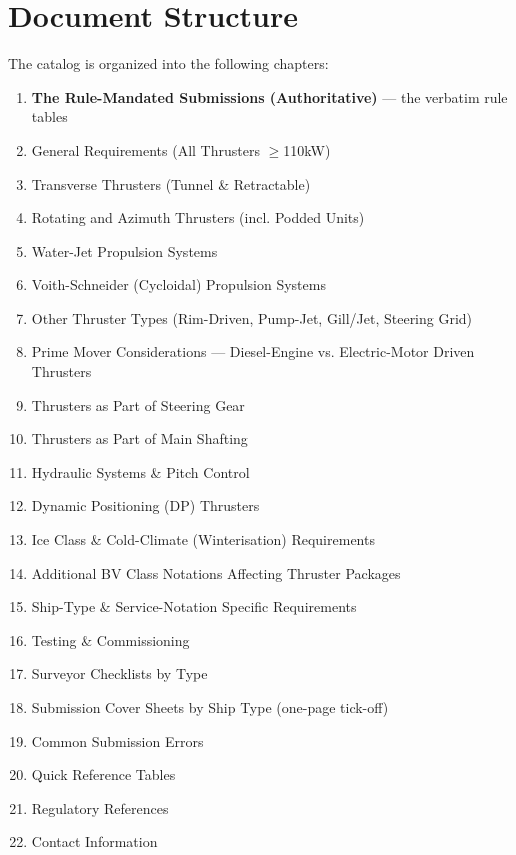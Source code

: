 \documentclass[11pt,a4paper]{report}
\begin{document}
\section*{Document Structure}
The catalog is organized into the following chapters:
\begin{enumerate}[leftmargin=*]
    \item \textbf{The Rule-Mandated Submissions (Authoritative)} --- the verbatim rule tables
    \item General Requirements (All Thrusters $\geq$110kW)
    \item Transverse Thrusters (Tunnel \& Retractable)
    \item Rotating and Azimuth Thrusters (incl. Podded Units)
    \item Water-Jet Propulsion Systems
    \item Voith-Schneider (Cycloidal) Propulsion Systems
    \item Other Thruster Types (Rim-Driven, Pump-Jet, Gill/Jet, Steering Grid)
    \item Prime Mover Considerations --- Diesel-Engine vs. Electric-Motor Driven Thrusters
    \item Thrusters as Part of Steering Gear
    \item Thrusters as Part of Main Shafting
    \item Hydraulic Systems \& Pitch Control
    \item Dynamic Positioning (DP) Thrusters
    \item Ice Class \& Cold-Climate (Winterisation) Requirements
    \item Additional BV Class Notations Affecting Thruster Packages
    \item Ship-Type \& Service-Notation Specific Requirements
    \item Testing \& Commissioning
    \item Surveyor Checklists by Type
    \item Submission Cover Sheets by Ship Type (one-page tick-off)
    \item Common Submission Errors
    \item Quick Reference Tables
    \item Regulatory References
    \item Contact Information
\end{enumerate}
\end{document}
